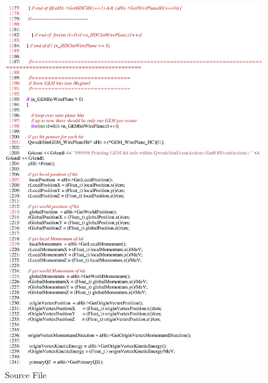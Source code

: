 \begin{figure}[h]
  \hspace{0cm}
  \includegraphics[scale=0.8]{./figures13/QweakSimEventAction.cc-p21.eps}
  \caption{Source File}
           \label{fig:XIII-SC-36}
\end{figure}

\clearpage

